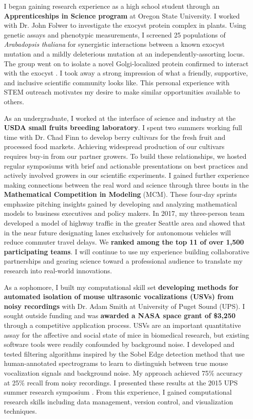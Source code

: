 \noindent
\underline{}
I began gaining research experience as a high school student through an \textbf{Apprenticeships in Science program} at Oregon State University.
I worked with Dr. John Folwer to investigate the exocyst protein complex in plants.
Using genetic assays and phenotypic measurements, I screened 25 populations of \textit{Arabadopsis thaliana} for synergistic interactions between a known exocyst mutation and a mildly deleterious mutation at an independently-assorting locus.
The group went on to isolate a novel Golgi-localized protein confirmed to interact with the exocyst \cite{fowler}.
I took away a strong impression of what a friendly, supportive, and inclusive scientific community looks like.
This personal experience with STEM outreach motivates my desire to make similar opportunities available to others.

As an undergraduate, I worked at the interface of science and industry at the \textbf{USDA small fruits breeding laboratory}.
I spent two summers working full time with Dr. Chad Finn to develop berry cultivars for the fresh fruit and processed food markets.
Achieving widespread production of our cultivars requires buy-in from our partner growers.
To build these relationships, we hosted regular symposiums with brief and actionable presentations on best practices and actively involved growers in our scientific experiments.
I gained further experience making connections between the real word and science through three bouts in the \textbf{Mathematical Competition in Modeling} (MCM).
These four-day sprints emphasize pitching insights gained by developing and analyzing mathematical models to business executives and policy makers.
In 2017, my three-person team developed a model of highway traffic in the greater Seattle area and showed that in the near future designating lanes exclusively for autonomous vehicles will reduce commuter travel delays.
We \textbf{ranked among the top 11 of over 1,500 participating teams}.
I will continue to use my experience  building collaborative partnerships and gearing science toward a professional audience to translate my research into real-world innovations.

As a sophomore, I built my computational skill set \textbf{developing methods for automated isolation of mouse
ultrasonic vocalizations (USVs) from noisy recordings} with Dr. Adam Smith at University of Puget Sound (UPS).
I sought outside funding and was \textbf{awarded a NASA space grant of \$3,250} through a competitive application process.
USVs are an important quantitative assay for the affective and social state of mice in biomedical research, but existing software tools were readily confounded by background noise.
I developed and tested filtering algorithms inspired by the Sobel Edge detection method that use human-annotated spectrograms to learn to distinguish between true mouse vocalization signals and background noise.
My approach achieved 75\% accuracy at 25\% recall from noisy recordings.
I presented these results at the 2015 UPS summer research symposium \cite{smith}.
From this experience, I gained computational research skills including data management, version control, and visualization techniques.

